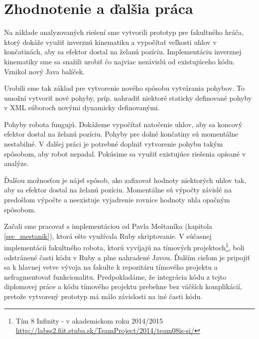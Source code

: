 \section{Zhodnotenie a ďalšia práca} \label{sec_conclusion}

Na základe analyzovaných riešení sme vytvorili prototyp pre fakultného hráča, ktorý dokáže využiť inverznú kinematiku a vypočítať veľkosti uhlov v končatinách, aby sa efektor dostal na želanú pozíciu. Implementáciu inverznej kinematiky sme sa snažili urobiť čo najviac nezávislú od existujúceho kódu. Vznikol nový Java balíček.

Urobili sme tak základ pre vytvorenie nového spôsobu vytvárania pohybov. To umožní vytvoriť nové pohyby, príp. nahradiť niektoré staticky definované pohyby v XML súboroch novými dynamicky definovanými.

Pohyby robota fungujú. Dokážeme vypočítať natočenie uhlov, aby sa koncový efektor dostal na želanú pozíciu. Pohyby pre dolné končatiny sú momentálne nestabilné. V ďalšej práci je potrebné doplniť vytvorenie pohybu takým spôsobom, aby robot nepadal. Pokúsime sa využiť existujúce riešenia opísané v analýze.

Ďalšou možnosťou je nájsť spôsob, ako zafixovať hodnoty niektorých uhlov tak, aby sa efektor dostal na želanú pozíciu. Momentálne sú výpočty závislé na predošlom výpočte a neexistuje vyjadrenie rovnice hodnoty uhla opačným spôsobom.

Začali sme pracovať s implementáciou od Pavla Meštaníka (kapitola \ref{sec_mestanik}), ktorá ešte využívala Ruby skriptovanie. V súčasnej implementácii fakultného robota, ktorú vyvíjajú na tímových projektoch\footnote{Tím 8 Infinity - v akademickom roku 2014/2015 \url{http://labss2.fiit.stuba.sk/TeamProject/2014/team08is-si/} }, boli odstránené časti kódu v Ruby a plne nahradené Javou. Ďalším cieľom je pripojiť sa k hlavnej vetve vývoja na fakulte k repozitáru tímového projektu a nefragmentovať funkcionalitu. Predpokladáme, že integrácia kódu z tejto diplomovej práce a kódu tímového projektu prebehne bez väčších komplikácií, pretože vytvorený prototyp má málo závislosti na iné časti kódu.